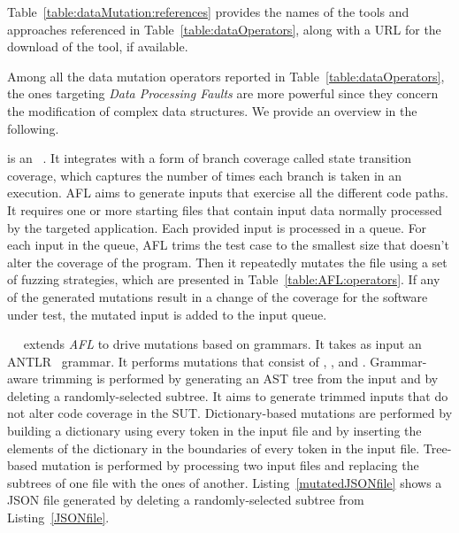 Table~\ref{table:dataMutation:references} provides the names of the tools and approaches referenced in Table~\ref{table:dataOperators}, along with a URL for the download of the tool, if available.





Among all the data mutation operators reported in Table~\ref{table:dataOperators}, the ones targeting \emph{Data Processing Faults} are more powerful since they concern the modification of complex data structures. %
We provide an overview in the following.




 is an ~\cite{gutmann2016fuzzing}. It integrates  with a form of branch coverage called state transition coverage,
which captures the number of times each branch is taken in an execution. 
AFL aims to generate inputs that exercise all the different code paths.
It requires one or more starting files that contain input data normally processed by the targeted application. 
Each provided input is processed in a queue. For each input in the queue, AFL trims the test case to the smallest size that doesn't alter the coverage of the program. Then it repeatedly mutates the file using a set of fuzzing strategies, which are presented in Table~\ref{table:AFL:operators}.
If any of the generated mutations result in a change of the coverage for the software under test, the mutated input is added to the input queue.



~\Superion~ extends \emph{AFL} to drive mutations based on grammars. It takes as input an ANTLR~\cite{ANTLR} grammar. 
It performs mutations that consist of , , and .
Grammar-aware trimming is performed by generating an AST tree from the input and by deleting a randomly-selected subtree. 
It aims to generate trimmed inputs that do not alter code coverage in the SUT.
Dictionary-based mutations are performed by building a dictionary using every token in the input file and by inserting the elements of the dictionary in the boundaries of every token in the input file.
Tree-based mutation is performed by processing two input files and replacing the subtrees of one file with the ones of another.
Listing~\ref{mutatedJSONfile} shows a JSON file generated by deleting a randomly-selected subtree from Listing~\ref{JSONfile}.


